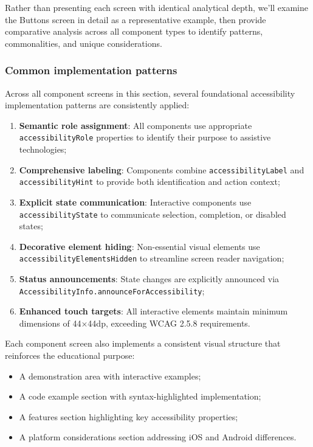 Rather than presenting each screen with identical analytical depth, we'll examine the Buttons screen in detail as a representative example, then provide comparative analysis across all component types to identify patterns, commonalities, and unique considerations.

\subsubsection{Common implementation patterns}
\label{subsubsec:common-patterns}

Across all component screens in this section, several foundational accessibility implementation patterns are consistently applied:

\begin{enumerate}
    \item \textbf{Semantic role assignment}: All components use appropriate \texttt{accessibilityRole} properties to identify their purpose to assistive technologies;
    
    \item \textbf{Comprehensive labeling}: Components combine \texttt{accessibilityLabel} and \texttt{accessibilityHint} to provide both identification and action context;
    
    \item \textbf{Explicit state communication}: Interactive components use \texttt{accessibilityState} to communicate selection, completion, or disabled states;
    
    \item \textbf{Decorative element hiding}: Non-essential visual elements use \texttt{accessibilityElementsHidden} to streamline screen reader navigation;
    
    \item \textbf{Status announcements}: State changes are explicitly announced via \texttt{AccessibilityInfo.announceForAccessibility};
    
    \item \textbf{Enhanced touch targets}: All interactive elements maintain minimum dimensions of 44×44dp, exceeding WCAG 2.5.8 requirements.
\end{enumerate}

Each component screen also implements a consistent visual structure that reinforces the educational purpose:

\begin{itemize}
    \item A demonstration area with interactive examples;
    \item A code example section with syntax-highlighted implementation;
    \item A features section highlighting key accessibility properties;
    \item A platform considerations section addressing iOS and Android differences.
\end{itemize}


